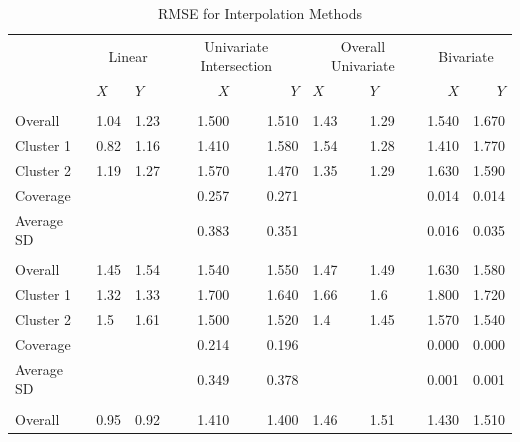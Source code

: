 \documentclass[12pt]{article}
\begin{document}
\begin{table}

\caption{\label{tab:results-table-by-clust}RMSE for Interpolation Methods}
\centering
\begin{tabular}[t]{lllrrllrr}
\toprule
\multicolumn{1}{c}{} & \multicolumn{2}{c}{Linear} & \multicolumn{2}{c}{Univariate Intersection} & \multicolumn{2}{c}{Overall Univariate} & \multicolumn{2}{c}{Bivariate} \\
\cmidrule(l{3pt}r{3pt}){2-3} \cmidrule(l{3pt}r{3pt}){4-5} \cmidrule(l{3pt}r{3pt}){6-7} \cmidrule(l{3pt}r{3pt}){8-9}
 & $X$ & $Y$ & $X$ & $Y$ & $X$ & $Y$ & $X$ & $Y$\\
\midrule
\addlinespace[0.3em]
\multicolumn{9}{l}{\textbf{Simulation 1}}\\
\hspace{1em}Overall & 1.04 & 1.23 & 1.500 & 1.510 & 1.43 & 1.29 & 1.540 & 1.670\\
\hspace{1em}Cluster 1 & 0.82 & 1.16 & 1.410 & 1.580 & 1.54 & 1.28 & 1.410 & 1.770\\
\hspace{1em}Cluster 2 & 1.19 & 1.27 & 1.570 & 1.470 & 1.35 & 1.29 & 1.630 & 1.590\\
\hspace{1em}Coverage &  &  & 0.257 & 0.271 &  &  & 0.014 & 0.014\\
\hspace{1em}Average SD &  &  & 0.383 & 0.351 &  &  & 0.016 & 0.035\\
\addlinespace[0.3em]
\multicolumn{9}{l}{\textbf{Simulation 2}}\\
\hspace{1em}Overall & 1.45 & 1.54 & 1.540 & 1.550 & 1.47 & 1.49 & 1.630 & 1.580\\
\hspace{1em}Cluster 1 & 1.32 & 1.33 & 1.700 & 1.640 & 1.66 & 1.6 & 1.800 & 1.720\\
\hspace{1em}Cluster 2 & 1.5 & 1.61 & 1.500 & 1.520 & 1.4 & 1.45 & 1.570 & 1.540\\
\hspace{1em}Coverage &  &  & 0.214 & 0.196 &  &  & 0.000 & 0.000\\
\hspace{1em}Average SD &  &  & 0.349 & 0.378 &  &  & 0.001 & 0.001\\
\addlinespace[0.3em]
\multicolumn{9}{l}{\textbf{Simulation 3}}\\
\hspace{1em}Overall & 0.95 & 0.92 & 1.410 & 1.400 & 1.46 & 1.51 & 1.430 & 1.510\\

\end{tabular}
\end{table}
\end{document}
